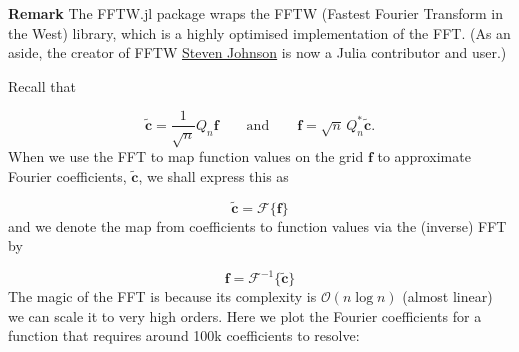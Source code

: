 \documentclass[12pt,a4paper]{article}
\begin{document}
\textbf{Remark} The FFTW.jl package wraps the FFTW (Fastest Fourier Transform in the West) library, which is a highly optimised implementation of the FFT. (As an aside, the creator of FFTW \href{https://math.mit.edu/~stevenj/}{Steven Johnson} is now a Julia contributor and user.)

Recall that 

\[
\widetilde{\mathbf{c}} =  \frac{1}{\sqrt{n}}Q_{n}\mathbf{f} \qquad \text{and} \qquad \mathbf{f} = \sqrt{n}\,Q_{n}^*\widetilde{\mathbf{c}}.
\]
When we use the FFT to map function values on the grid $\mathbf{f}$ to approximate Fourier coefficients, $\widetilde{\mathbf{c}}$, we shall express this as

\[
\widetilde{\mathbf{c}} = \mathcal{F}\lbrace \mathbf{f}  \rbrace
\]
and we denote the map from coefficients to function values via the (inverse) FFT by

\[
\mathbf{f}  = \mathcal{F}^{-1}\lbrace \widetilde{\mathbf{c}} \rbrace
\]
The magic of the FFT is because its complexity is $\mathcal{O}(n \log n)$ (almost linear) we can scale it to very high orders. Here we plot the Fourier coefficients for a function that requires around 100k coefficients to resolve:
\end{document}
